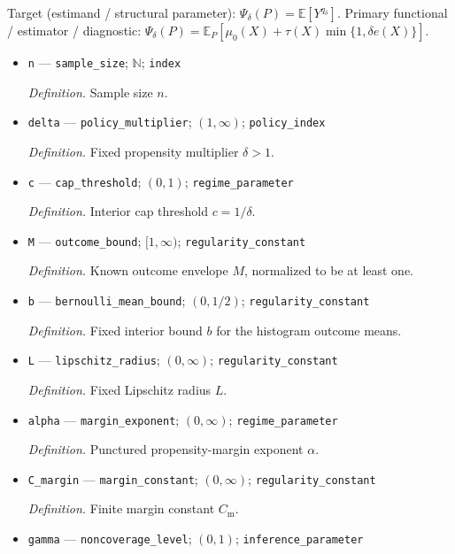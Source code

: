\documentclass{article}
\begin{document}
Target (estimand / structural parameter): \(\Psi_\delta(P)=\mathbb E[Y^{q_\delta}]\).
Primary functional / estimator / diagnostic: \(\Psi_\delta(P)=\mathbb E_P[\mu_0(X)+\tau(X)\min\{1,\delta e(X)\}]\).
\begin{itemize}
  \item \texttt{n} --- \texttt{sample\_\allowbreak{}size}; \(\mathbb N\); \texttt{index}
  \par\smallskip\noindent\emph{Definition.} Sample size \(n\).
  \item \texttt{delta} --- \texttt{policy\_\allowbreak{}multiplier}; \((1,\infty)\); \texttt{policy\_\allowbreak{}index}
  \par\smallskip\noindent\emph{Definition.} Fixed propensity multiplier \(\delta>1\).
  \item \texttt{c} --- \texttt{cap\_\allowbreak{}threshold}; \((0,1)\); \texttt{regime\_\allowbreak{}parameter}
  \par\smallskip\noindent\emph{Definition.} Interior cap threshold \(c=1/\delta\).
  \item \texttt{M} --- \texttt{outcome\_\allowbreak{}bound}; \([1,\infty)\); \texttt{regularity\_\allowbreak{}constant}
  \par\smallskip\noindent\emph{Definition.} Known outcome envelope \(M\), normalized to be at least one.
  \item \texttt{b} --- \texttt{bernoulli\_\allowbreak{}mean\_\allowbreak{}bound}; \((0,1/2)\); \texttt{regularity\_\allowbreak{}constant}
  \par\smallskip\noindent\emph{Definition.} Fixed interior bound \(b\) for the histogram outcome means.
  \item \texttt{L} --- \texttt{lipschitz\_\allowbreak{}radius}; \((0,\infty)\); \texttt{regularity\_\allowbreak{}constant}
  \par\smallskip\noindent\emph{Definition.} Fixed Lipschitz radius \(L\).
  \item \texttt{alpha} --- \texttt{margin\_\allowbreak{}exponent}; \((0,\infty)\); \texttt{regime\_\allowbreak{}parameter}
  \par\smallskip\noindent\emph{Definition.} Punctured propensity-margin exponent \(\alpha\).
  \item \texttt{C\_\allowbreak{}margin} --- \texttt{margin\_\allowbreak{}constant}; \((0,\infty)\); \texttt{regularity\_\allowbreak{}constant}
  \par\smallskip\noindent\emph{Definition.} Finite margin constant \(C_{\mathrm m}\).
  \item \texttt{gamma} --- \texttt{noncoverage\_\allowbreak{}level}; \((0,1)\); \texttt{inference\_\allowbreak{}parameter}

\end{itemize}
\end{document}
